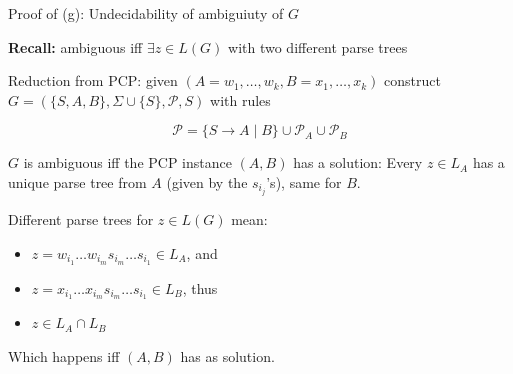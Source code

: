 \documentclass[handout]{beamer}
\begin{document}
\begin{frame}{Proof of (g): Undecidability of ambiguiuty of $G$}

    \textbf{Recall:} ambiguous iff $\exists z\in L(G)$ with two different parse trees

    \medskip

    \alert{Reduction from PCP:} given $(A=w_1,\ldots, w_k,B=x_1,\ldots, x_k)$ construct $G=(\{S,A,B\},\Sigma\cup\{S\},\mathcal P,S)$ with rules
    \begin{minipage}{0.7\textwidth}
            
        \medskip
        $$
        \mathcal P=\{S\to A\mid B\}\cup\mathcal P_A\cup\mathcal P_B
        $$

        $G$ is ambiguous iff the PCP instance $(A,B)$ has a solution: Every $z\in L_A$ has a unique parse tree from $A$ (given by the $s_{i_j}$'s), same for $B$.
        
        \medskip
        
        Different parse trees for $z\in L(G)$ mean:
        \begin{itemize}
            \item $z=w_{i_1}\dots w_{i_m}s_{i_m}\dots s_{i_1}\in L_A$, and
            \item $z=x_{i_1}\dots x_{i_m}s_{i_m}\dots s_{i_1}\in L_B$, thus
            \item $z\in L_A\cap L_B$
        \end{itemize}
        Which happens iff $(A,B)$ has as solution.
    \end{minipage}
    \begin{minipage}{0.28\textwidth}
        \vspace{12pt}

        \vspace{-18pt}
        \phantom{.}\hfill\qedsymbol
    \end{minipage}

\end{frame}
\end{document}
